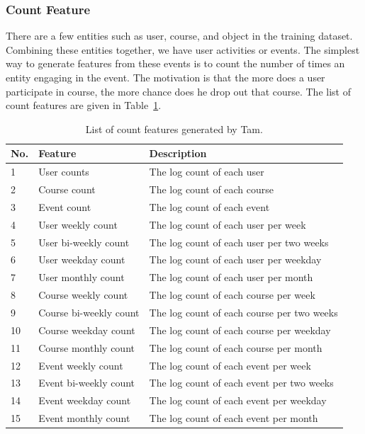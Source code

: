 \subsubsection{Count Feature}
There are a few entities such as user, course, and object in the training dataset. Combining these entities together, we have user activities or events. The simplest way to generate features from these events is to count the number of times an entity engaging in the event. The motivation is that the more does a user participate in course, the more chance does he drop out that course. The list of count features are given in Table~\ref{tb:tnfeature1}.

\begin{center}
	\begin{table}[ht]
		\begin{minipage}{\textwidth}
			{
				\small
				\hfill{}
				\begin{tabular}{|l|l|l|}
					\hline
					\textbf{No.}&\textbf{Feature}&\textbf{Description}\tabularnewline \hline
					1 & User counts & The log count of each user \tabularnewline
					2 & Course count & The log count of each course \tabularnewline
					3 & Event count & The log count of each event \tabularnewline
					4 & User weekly count & The log count of each user per week \tabularnewline
					5 & User bi-weekly count & The log count of each user per two weeks \tabularnewline
					6 & User weekday count & The log count of each user per weekday \tabularnewline
					7 & User monthly count & The log count of each user per month\tabularnewline
					8 & Course weekly count & The log count of each course per week \tabularnewline
					9 & Course bi-weekly count & The log count of each course per two weeks \tabularnewline
					10 & Course weekday count & The log count of each course per weekday\tabularnewline
					11 & Course monthly count & The log count of each course per month \tabularnewline
					12 & Event weekly count & The log count of each event per week \tabularnewline
					13 & Event bi-weekly count & The log count of each event per two weeks \tabularnewline
					14 & Event weekday count & The log count of each event per weekday \tabularnewline
					15 & Event monthly count & The log count of each event per month \tabularnewline
					\hline
				\end{tabular}
			}
			\hfill{}
			\caption{List of count features generated by Tam.}
			\label{tb:tnfeature1}
		\end{minipage}
	\end{table}
\end{center}

